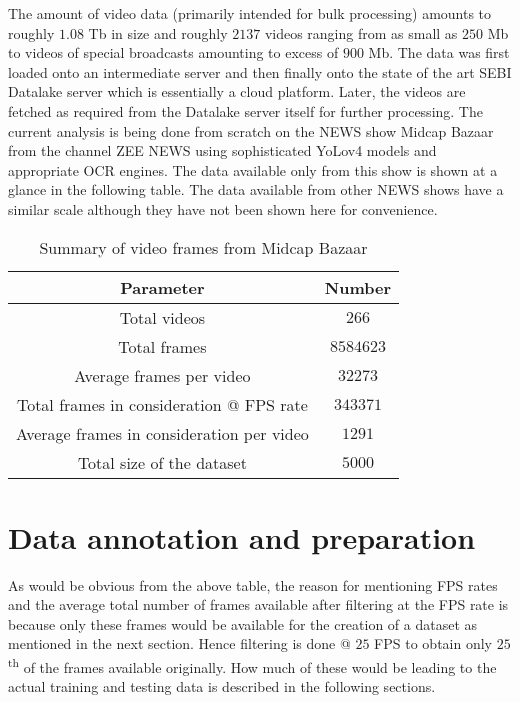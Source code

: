 The amount of video data (primarily intended for bulk processing) amounts to roughly $1.08$ Tb in size and roughly $2137$ videos ranging from as small as $250$ Mb to videos of special broadcasts amounting to excess of $900$ Mb. The data was first loaded onto an intermediate server and then finally onto the state of the art SEBI Datalake server which is essentially a cloud platform. Later, the videos are fetched as required from the Datalake server itself for further processing. The current analysis is being done from scratch on the NEWS show Midcap Bazaar from the channel ZEE NEWS using sophisticated YoLov4 models and appropriate OCR engines. The data available only from this show is shown at a glance in the following table. The data available from other NEWS shows have a similar scale although they have not been shown here for convenience.

\begin{table}[h]
 \def\arraystretch{1.5}
 \centering
 \caption{Summary of video frames from Midcap Bazaar}
 \begin{tabular}{|c|c|}
  \hline
  Parameter & Number\\
  \hline
  Total videos & $266$                   \\
  \hline
  Total frames & $8584623$                   \\
  \hline
  Average frames per video & $32273$                   \\
  \hline
  Total frames in consideration @ FPS rate & $343371$                   \\
  \hline
  Average frames in consideration per video & $1291$                   \\
  \hline
  Total size of the dataset & $5000$                   \\
  \hline
 \end{tabular}
 \label{tab:vid_data_tab}
\end{table}

\section{Data annotation and preparation}

As would be obvious from the above table, the reason for mentioning FPS rates and the average total number of frames available after filtering at the FPS rate is because only these frames would be available for the creation of a dataset as mentioned in the next section. Hence filtering is done @ $25$ FPS to obtain only $25$\textsuperscript{th} of the frames available originally. How much of these would be leading to the actual training and testing data is described in the following sections. \par

